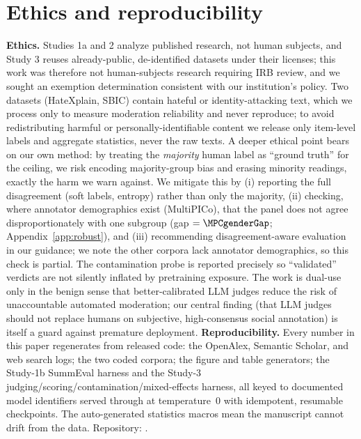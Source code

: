 \section{Ethics and reproducibility}
\textbf{Ethics.} Studies 1a and 2 analyze published research, not human subjects, and Study 3 reuses already-public,
de-identified datasets under their licenses; this work was therefore not human-subjects research requiring IRB
review, and we sought an exemption determination consistent with our institution's policy. Two datasets (HateXplain,
SBIC) contain hateful or identity-attacking text, which we process only to measure moderation reliability and never
reproduce; to avoid redistributing harmful or personally-identifiable content we release only item-level labels and
aggregate statistics, never the raw texts. A deeper ethical point bears on our own method: by treating the
\emph{majority} human label as ``ground truth'' for the ceiling, we risk encoding majority-group bias and erasing
minority readings, exactly the harm we warn against. We mitigate this by (i) reporting the full disagreement (soft
labels, entropy) rather than only the majority, (ii) checking, where annotator demographics exist (MultiPICo), that
the panel does not agree disproportionately with one subgroup (gap $=\MPCgenderGap$; Appendix~\ref{app:robust}), and
(iii) recommending disagreement-aware evaluation in our guidance; we note the other corpora lack annotator
demographics, so this check is partial. The contamination probe is reported precisely so ``validated'' verdicts are
not silently inflated by pretraining exposure. The work is dual-use only in the benign sense that better-calibrated
LLM judges reduce the risk of unaccountable automated moderation; our central finding (that LLM judges should not
replace humans on subjective, high-consensus social annotation) is itself a guard against premature deployment.
\textbf{Reproducibility.} Every number in this paper regenerates from released code: the OpenAlex, Semantic Scholar,
and web search logs; the two coded corpora; the figure and table generators; the Study-1b SummEval harness and the
Study-3 judging/scoring/contamination/mixed-effects harness, all keyed to documented model identifiers served through
\PROVIDER{} at temperature~$0$ with idempotent, resumable checkpoints. The auto-generated statistics macros
mean the manuscript cannot drift from the data. Repository: \REPO{}.

